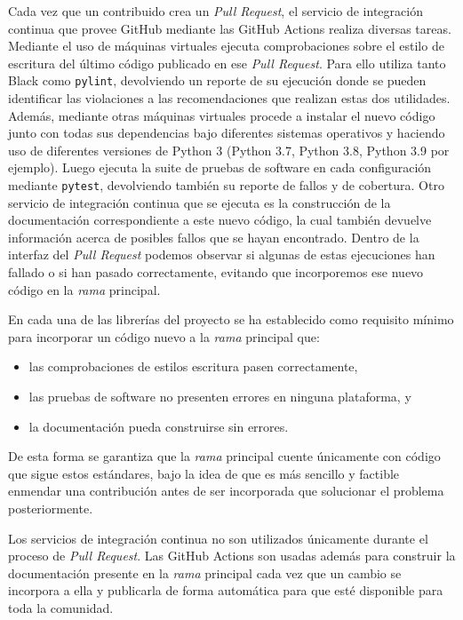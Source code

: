 Cada vez que un contribuido crea un \emph{Pull Request}, el servicio de
integración continua que provee GitHub mediante las GitHub Actions realiza
diversas tareas.
Mediante el uso de máquinas virtuales ejecuta comprobaciones sobre el estilo de
escritura del último código publicado en ese \emph{Pull Request}.
Para ello utiliza tanto Black como \texttt{pylint}, devolviendo un reporte de
su ejecución donde se pueden identificar las violaciones a las recomendaciones
que realizan estas dos utilidades.
Además, mediante otras máquinas virtuales procede a instalar el nuevo código
junto con todas sus dependencias bajo diferentes sistemas operativos y haciendo
uso de diferentes versiones de Python 3 (Python 3.7, Python 3.8, Python 3.9 por
ejemplo).
Luego ejecuta la suite de pruebas de software en cada configuración mediante
\texttt{pytest}, devolviendo también su reporte de fallos y de cobertura.
Otro servicio de integración continua que se ejecuta es la construcción de la
documentación correspondiente a este nuevo código, la cual también devuelve
información acerca de posibles fallos que se hayan encontrado.
Dentro de la interfaz del \emph{Pull Request} podemos observar si algunas de
estas ejecuciones han fallado o si han pasado correctamente, evitando que
incorporemos ese nuevo código en la \emph{rama} principal.

En cada una de las librerías del proyecto se ha establecido como requisito
mínimo para incorporar un código nuevo a la \emph{rama} principal que:

\begin{itemize}
    \item las comprobaciones de estilos escritura pasen correctamente,
    \item las pruebas de software no presenten errores en ninguna plataforma, y
    \item la documentación pueda construirse sin errores.
\end{itemize}

De esta forma se garantiza que la \emph{rama} principal cuente únicamente con
código que sigue estos estándares, bajo la idea de que es más sencillo
y factible enmendar una contribución antes de ser incorporada que solucionar el
problema posteriormente.

Los servicios de integración continua no son utilizados únicamente durante el
proceso de \emph{Pull Request}.
Las GitHub Actions son usadas además para construir la documentación presente
en la \emph{rama} principal cada vez que un cambio se incorpora a ella
y publicarla de forma automática para que esté disponible para toda la
comunidad.

